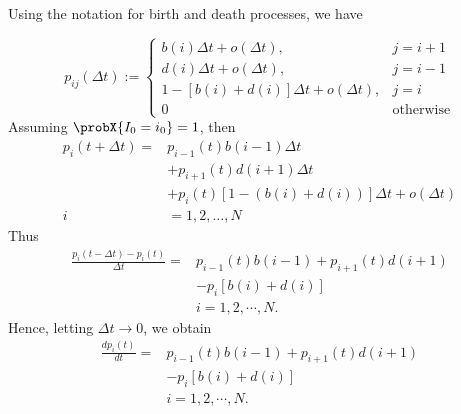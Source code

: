 \documentclass[9pt]{beamer}
\begin{document}
    \begin{frame}{}
        Using the notation for birth and death
        processes, we have

        \begin{equation*}
            p_{ij}(\Delta t):=
                \begin{cases}
                    b(i) \Delta t + o(\Delta t),     
                        & j = i + 1
                    \\
                    d(i) \Delta t + o(\Delta t), 
                        &   j = i - 1
                    \\
                    1 - \left [
                            b(i) + d(i) %
                        \right] \Delta t
                        + o(\Delta t), 
                        & j=i
                    \\
                    0 & \text{otherwise}
                \end{cases}
        \end{equation*}
        Assuming $\probX{I_0 = i_0} = 1$, then
        \begin{align*}
            p_i(t + \Delta t)
                =&
                    p_{i - 1} (t) b(i -1) \Delta t
                    \\
                    & + 
                        p_{i + 1} (t) d(i + 1) \Delta t
                    \\
                    & +
                        p_{i} (t)[1 - (b(i) + d(i))] \Delta t
                    + o(\Delta t)
            \\
            i &= 1, 2, \dots, N
        \end{align*}
        Thus
        \begin{align*}
            \frac{p_i (t - \Delta t) - p_i (t) }{\Delta t}
            = & 
            p_{i - 1} (t) b(i-1)
                +
                p_{i + 1} (t) d(i+1)  
            \\
                &-
                p_i [b(i) + d (i)] 
            \\
            & i = 1,2,\cdots, N.
        \end{align*}
        Hence, letting $\Delta t \to 0$,  we obtain
        \begin{align*}
            \frac{dp_i(t)}{dt}
            = & 
            p_{i - 1} (t) b(i-1)
                +
                p_{i + 1} (t) d(i+1)  
            \\
                &-
                p_i [b(i) + d (i)] 
            \\
                & i = 1,2,\cdots, N.
        \end{align*}
    \end{frame}
\end{document}
